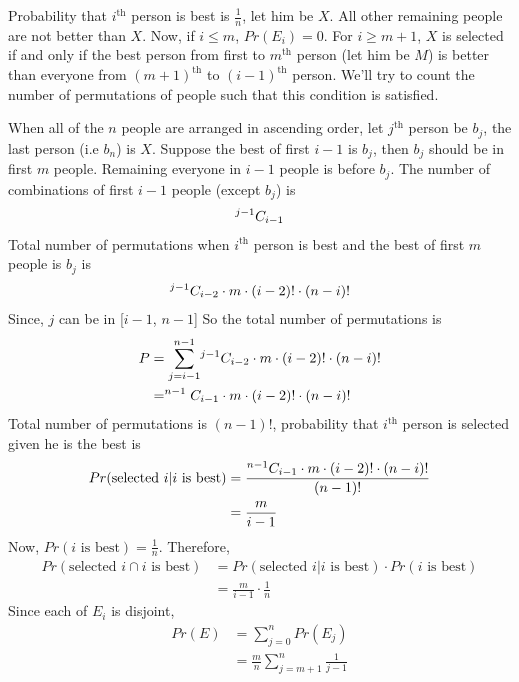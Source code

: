 \begin{tcolorbox}[breakable]
	\begin{sol}
		Probability that $i^\text{th}$ person is best is $\frac{1}{n}$,
		let him be $X$. All other remaining people are not better than
		$X$. Now, if $i\leq m$, $Pr(E_i) = 0$. For $i\geq m+1$, $X$ is
		selected if and only if the best person from first to
		$m^\text{th}$ person (let him be $M$) is better than everyone
		from $(m+1)^\text{th}$ to $(i-1)^\text{th}$ person. We'll try
		to count the number of permutations of people such that this
		condition is satisfied.

		When all of the $n$ people are arranged in ascending order, let
		$j^\text{th}$ person be $b_j$, the last person (i.e $b_n$) is
		$X$. Suppose the best of first $i-1$ is $b_j$, then $b_j$
		should be in first $m$ people. Remaining everyone in $i-1$
		people is before $b_j$. The number of combinations of first
		$i-1$ people (except $b_j$) is
		\begin{align}
			^{j-1}C_{i-1}
		\end{align}
		Total number of permutations when $i^\text{th}$ person is best
		and the best of first $m$ people is $b_j$ is
		\begin{align}
			^{j-1}C_{i-2}\cdot m\cdot (i-2)!\cdot(n-i)!
		\end{align}
		Since, $j$ can be in [$i-1$, $n-1$] So the total number of
		permutations is
		\begin{align}
			P & ={\sum_{j=i-1}^{n-1}} {^{j-1}C_{i-2}} \cdot m \cdot (i-2)! \cdot (n-i)! \\
			  & = ^{n-1}C_{i-1}\cdot m \cdot (i-2)! \cdot (n-i)!
		\end{align}
		Total number of permutations is $(n-1)!$, probability that
		$i^\text{th}$ person is selected given he is the best is
		\begin{align}
			Pr(\text{selected } i | i \text{ is best}) & = \frac{^{n-1}C_{i-1}\cdot m \cdot (i-2)! \cdot (n-i)!}{(n-1)!} \\
			                                           & = \frac{m}{i-1}
		\end{align}
		Now, $Pr(i\text{ is best}) = \frac{1}{n}$. Therefore,
		\begin{align}
			Pr(\text{selected } i \cap i \text{ is best}) & =
			Pr(\text{selected } i | i \text{ is best})\cdot Pr(i
			\text{ is best})                                  \\
			                                              & =
			\frac{m}{i-1}\cdot \frac{1}{n}
		\end{align}
		Since each of $E_i$ is disjoint,
		\begin{align}
			Pr(E) & = \sum_{j=0}^{n} Pr(E_j)                    \\
			      & = \frac{m}{n}\sum_{j=m+1}^{n} \frac{1}{j-1}
		\end{align}


\end{sol}
\end{tcolorbox}
